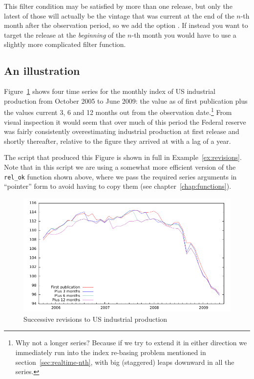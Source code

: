 This filter condition may be satisfied by more than one release, but
only the latest of those will actually be the vintage that was current
at the end of the $n$-th month after the observation period, so we add
the option .  If instead you
want to target the release at the \emph{beginning} of the $n$-th month
you would have to use a slightly more complicated filter function.

\subsection{An illustration}

Figure~\ref{fig:realtime-lag} shows four time series for the monthly
index of US industrial production from October 2005 to June 2009: the
value as of first publication plus the values current 3, 6 and 12
months out from the observation date.\footnote{Why not a longer
  series? Because if we try to extend it in either direction we
  immediately run into the index re-basing problem mentioned in
  section~\ref{sec:realtime-nth}, with big (staggered) leaps downward
  in all the series.} From visual inspection it would seem that over
much of this period the Federal reserve was fairly consistently
overestimating industrial production at first release and shortly
thereafter, relative to the figure they arrived at with a lag of a
year.

The script that produced this Figure is shown in full in
Example~\ref{ex:revisions}. Note that in this script we are using a
somewhat more efficient version of the \verb|rel_ok| function shown
above, where we pass the required series arguments in ``pointer'' form
to avoid having to copy them (see chapter~\ref{chap:functions}).

\begin{figure}[htbp]
  \centering
\includegraphics{figures/realtime}
  \caption{Successive revisions to US industrial production}
  \label{fig:realtime-lag}
\end{figure}

